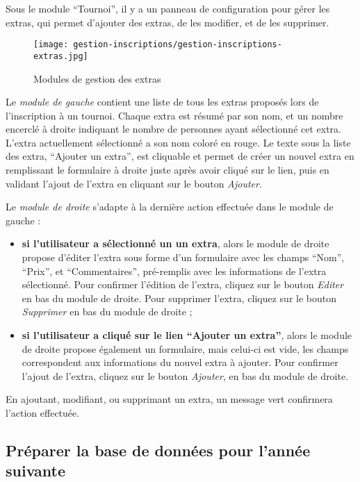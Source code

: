 Sous le module \enquote{Tournoi}, il y a un panneau de configuration pour gérer les extras, qui permet d'ajouter des extras, de les modifier, et de les supprimer.

\begin{figure}[H]
\centering
\texttt{[image: gestion-inscriptions/gestion-inscriptions-extras.jpg]}
\caption{Modules de gestion des extras}
\end{figure}

Le \textit{module de gauche} contient une liste de tous les extras proposés lors de l'inscription à un tournoi. Chaque extra est résumé par son nom, et un nombre encerclé à droite indiquant le nombre de personnes ayant sélectionné cet extra. L'extra actuellement sélectionné a son nom coloré en rouge. Le texte sous la liste des extra, \enquote{Ajouter un extra}, est cliquable et permet de créer un nouvel extra en remplissant le formulaire à droite juste après avoir cliqué sur le lien, puis en validant l'ajout de l'extra en cliquant sur le bouton \textit{Ajouter}.\newline

Le \textit{module de droite} s'adapte à la dernière action effectuée dans le module de gauche :

\begin{itemize}
\item \textbf{si l'utilisateur a sélectionné un un extra}, alors le module de droite propose d'éditer l'extra sous forme d'un formulaire avec les champs \enquote{Nom}, \enquote{Prix}, et \enquote{Commentaires}, pré-remplis avec les informations de l'extra sélectionné. Pour confirmer l'édition de l'extra, cliquez sur le bouton \textit{Editer} en bas du module de droite. Pour supprimer l'extra, cliquez sur le bouton \textit{Supprimer} en bas du module de droite ;
\item \textbf{si l'utilisateur a cliqué sur le lien \enquote{Ajouter un extra}}, alors le module de droite propose également un formulaire, mais celui-ci est vide, les champs correspondent aux informations du nouvel extra à ajouter. Pour confirmer l'ajout de l'extra, cliquez sur le bouton \textit{Ajouter}, en bas du module de droite.
\end{itemize}
\bigskip

En ajoutant, modifiant, ou supprimant un extra, un message vert confirmera l'action effectuée.

\subsection{Préparer la base de données pour l'année suivante}

